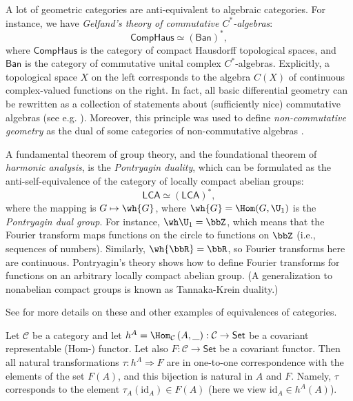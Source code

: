 %
\begin{example}\label{example Gelfand duality}
    A lot of geometric categories are anti-equivalent to algebraic categories.
    For instance, we have \emph{Gelfand's theory of commutative $C^{\ast}$-algebras}:
    \[
    \mathsf{CompHaus}\simeq\left(\mathsf{Ban}\right)^{\ast},
    \]
    where $\mathsf{CompHaus}$ is the category of compact Hausdorff topological
    spaces, and $\mathsf{Ban}$ is the category of commutative unital complex
    $C^{\ast}$-algebras. Explicitly, a topological space $X$
    on the left corresponds to the algebra $C\left(X\right)$ of continuous
    complex-valued functions on the right. In fact, all basic differential
    geometry can be rewritten as a collection of statements about (sufficiently nice)
    commutative algebras (see e.g. \cite{JetNest}). Moreover, this principle was used to define \emph{non-commutative geometry} as the dual of some categories of non-commutative algebras \cite{Connes}.
\end{example}
%
\begin{example}
    A fundamental theorem of group theory, and the foundational theorem
    of \emph{harmonic analysis}, is the \emph{Pontryagin duality}, which
    can be formulated as the anti-self-equivalence of the category of
    locally compact abelian groups:
    \[
    \mathsf{LCA}\simeq\left(\mathsf{LCA}\right)^{\ast},
    \]
    where the mapping is $G\mapsto\wh{G}$, where $\wh{G}=\Hom(G,\U_1)$ is the \emph{Pontryagin dual group}.  For instance, $\wh\U_1=\bbZ$, which means that the
    Fourier transform maps functions on the circle to functions on $\bbZ$
    (i.e., sequences of numbers). Similarly, $\wh{\bbR }=\bbR $,
    so Fourier transforms here are continuous. Pontryagin's theory shows
    how to define Fourier transforms for functions on an arbitrary locally compact
    abelian group. (A generalization to nonabelian compact groups is known as Tannaka-Krein duality.)

    See \cite[\S II.2]{GelMan} for more details on these and other examples
    of equivalences of categories.
\end{example}
\begin{thm}\label{Yoneda}
    Let $\mathcal{C}$ be a category and let $h^{A}=\Hom_{\mathcal{C}}\left(A,\_\right):\mathcal{C}\to\mathsf{Set}$
    be a covariant representable (Hom-) functor. Let also $F:\mathcal{C}\to\mathsf{Set}$
    be a covariant functor. Then all natural transformations $\tau:h^{A}\Longrightarrow F$
    are in one-to-one correspondence with the elements of the set $F(A)$,
    and this bijection is natural in $A$ and $F$. Namely, $\tau$ corresponds to the element $\tau_A(\mathrm{id}_A)\in F(A)$ (here we view $\mathrm{id}_A\in h^A(A)$).
\end{thm}

